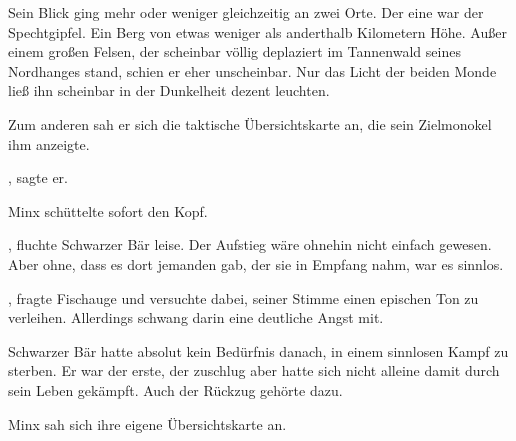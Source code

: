 \par

Sein Blick ging mehr oder weniger gleichzeitig an zwei Orte. Der eine war der Spechtgipfel. Ein Berg von etwas weniger als anderthalb Kilometern Höhe. Außer einem großen Felsen, der scheinbar völlig deplaziert im Tannenwald seines Nordhanges stand, schien er eher unscheinbar. Nur das Licht der beiden Monde ließ ihn scheinbar in der Dunkelheit dezent leuchten.

\par

Zum anderen sah er sich die taktische Übersichtskarte an, die sein Zielmonokel ihm anzeigte.

\par

, sagte er. 

\par

Minx schüttelte sofort den Kopf. 

\par

, fluchte Schwarzer Bär leise. Der Aufstieg wäre ohnehin nicht einfach gewesen. Aber ohne, dass es dort jemanden gab, der sie in Empfang nahm, war es sinnlos.

\par

, fragte Fischauge und versuchte dabei, seiner Stimme einen epischen Ton zu verleihen. Allerdings schwang darin eine deutliche Angst mit.

\par

Schwarzer Bär hatte absolut kein Bedürfnis danach, in einem sinnlosen Kampf zu sterben. Er war der erste, der zuschlug aber hatte sich nicht alleine damit durch sein Leben gekämpft. Auch der Rückzug gehörte dazu.

\par


\par

Minx sah sich ihre eigene Übersichtskarte an. 

\par

